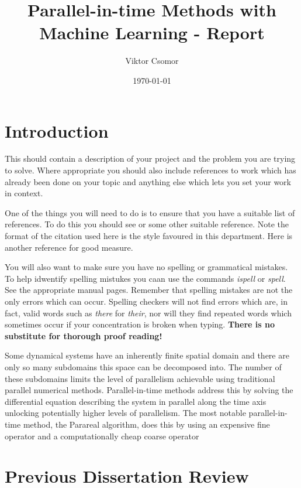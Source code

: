 \documentclass{article}
\begin{document}

\title{Parallel-in-time Methods with Machine Learning - Report}
\author{Viktor Csomor}
\date{\today}

\makeEPCCtitle

\newpage

\tableofcontents

\newpage
{}

\section{Introduction}

This should contain a description of your project and the problem you
are trying to solve. Where appropriate you should also include
references to work which has already been done on your topic and
anything else which lets you set your work in context.

One of the things you will need to do is to ensure that you have a
suitable list of references.  To do this you should see \cite{ref:lam}
or some other suitable reference.  Note the format of the citation used
here is the style favoured in this department.  Here is another
reference \cite{ref:bloggs} for good measure.

You will also want to make sure you have no spelling or grammatical
mistakes. To help idwentify spelling mistukes you caan use the commands
{\em ispell} or {\em spell}. See the appropriate manual pages. Remember
that spelling mistakes are not the only errors which can occur. Spelling
checkers will not find errors which are, in fact, valid words such as
{\em there} for {\em their}, nor will they find repeated words which
sometimes occur if your concentration is broken when typing. {\bf There
is no substitute for thorough proof reading!}

Some dynamical systems have an inherently finite spatial domain and there are only so many subdomains this space can be decomposed into. The number of these subdomains limits the level of parallelism achievable using traditional parallel numerical methods. Parallel-in-time methods address this by solving the differential equation describing the system in parallel along the time axis unlocking potentially higher levels of parallelism. The most notable parallel-in-time method, the Parareal algorithm, does this by using an expensive fine operator and a computationally cheap coarse operator

\section{Previous Dissertation Review}
\end{document}
